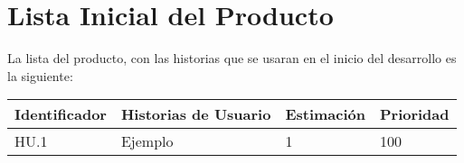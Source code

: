 \section{Lista Inicial del Producto}

La lista del producto, con las historias que se usaran en el inicio del desarrollo es la siguiente:\\

\begin{table}[h]
	\centering
	\begin{tabular}{| p{2.3cm} | p{5.1cm} | p{2cm} | p{1.6cm} |}
		\rowcolor[HTML]{329A9D} 
		{\color[HTML]{FFFFFF} \textbf{Identificador}} & {\color[HTML]{FFFFFF} \textbf{Historias de Usuario}} & {\color[HTML]{FFFFFF} \textbf{Estimación}} & {\color[HTML]{FFFFFF} \textbf{Prioridad}} \\ \hline
		HU.1 & Ejemplo & 1 & 100 \\         
		\hline              
	\end{tabular}
\end{table}